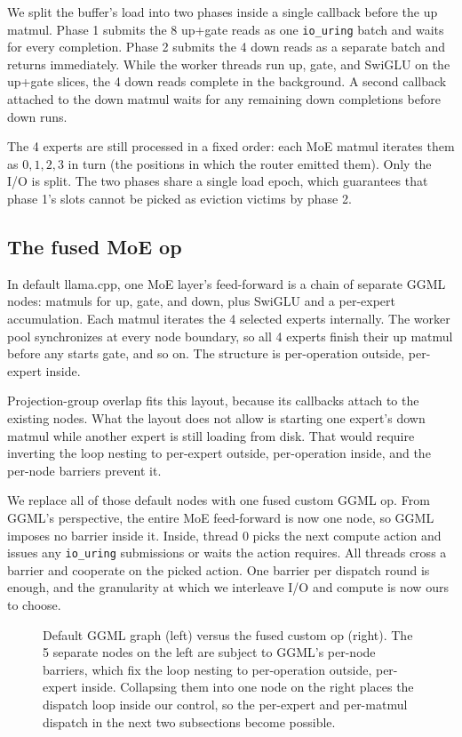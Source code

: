 We split the buffer's load into two phases inside a single callback before the up matmul.
Phase 1 submits the 8 up+gate reads as one \texttt{io\_uring} batch and waits for every completion.
Phase 2 submits the 4 down reads as a separate batch and returns immediately.
While the worker threads run up, gate, and SwiGLU on the up+gate slices, the 4 down reads complete in the background.
A second callback attached to the down matmul waits for any remaining down completions before down runs.

The 4 experts are still processed in a fixed order: each MoE matmul iterates them as $0, 1, 2, 3$ in turn (the positions in which the router emitted them).
Only the I/O is split.
The two phases share a single load epoch, which guarantees that phase 1's slots cannot be picked as eviction victims by phase 2.


\subsection{The fused MoE op}\label{sec:pipelining-fused}

In default llama.cpp, one MoE layer's feed-forward is a chain of separate GGML nodes: matmuls for up, gate, and down, plus SwiGLU and a per-expert accumulation.
Each matmul iterates the 4 selected experts internally.
The worker pool synchronizes at every node boundary, so all 4 experts finish their up matmul before any starts gate, and so on.
The structure is per-operation outside, per-expert inside.

Projection-group overlap fits this layout, because its callbacks attach to the existing nodes.
What the layout does not allow is starting one expert's down matmul while another expert is still loading from disk.
That would require inverting the loop nesting to per-expert outside, per-operation inside, and the per-node barriers prevent it.

We replace all of those default nodes with one fused custom GGML op.
From GGML's perspective, the entire MoE feed-forward is now one node, so GGML imposes no barrier inside it.
Inside, thread 0 picks the next compute action and issues any \texttt{io\_uring} submissions or waits the action requires.
All threads cross a barrier and cooperate on the picked action.
One barrier per dispatch round is enough, and the granularity at which we interleave I/O and compute is now ours to choose.

\begin{figure}[htbp]
\centering
\resizebox{0.95\textwidth}{!}{}
\caption[Default GGML graph versus the fused MoE op]{Default GGML graph (left) versus the fused custom op (right). The 5 separate nodes on the left are subject to GGML's per-node barriers, which fix the loop nesting to per-operation outside, per-expert inside. Collapsing them into one node on the right places the dispatch loop inside our control, so the per-expert and per-matmul dispatch in the next two subsections become possible.}
\label{fig:moe-fused-op}
\end{figure}


